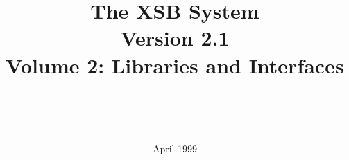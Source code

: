 \documentclass[11pt]{report}
\newcommand{\version}{Version 2.1}
\begin{document}
\title{\bf The XSB System \\ \version \\ Volume 2: Libraries and Interfaces}

\author{{\epsfxsize=230pt }\\
        \ \\ \ \\
} 

\date{April 1999}

\maketitle



\thispagestyle{empty}

\newpage
\thispagestyle{empty}
%

\tableofcontents
\newpage        %
  











\printindex
\end{document}
